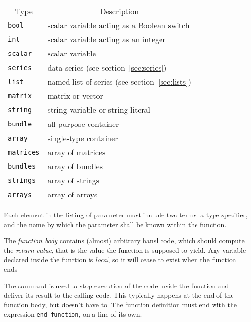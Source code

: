 \begin{center}
\begin{tabular}{ll}
  \multicolumn{1}{c}{Type} &
  \multicolumn{1}{c}{Description} \\ [4pt]
  \texttt{bool}   & scalar variable acting as a Boolean switch \\
  \texttt{int}    & scalar variable acting as an integer  \\
  \texttt{scalar} & scalar variable \\
  \texttt{series} & data series (see section~\ref{sec:series})\\
  \texttt{list}   & named list of series  (see section~\ref{sec:lists})\\
  \texttt{matrix} & matrix or vector \\
  \texttt{string} & string variable or string literal \\
  \texttt{bundle} & all-purpose container \\
  \texttt{array}  & single-type container \\
  \texttt{matrices} & array of matrices \\
  \texttt{bundles}  & array of bundles \\
  \texttt{strings}  & array of strings \\
  \texttt{arrays}   & array of arrays \\
\end{tabular}
\end{center}

Each element in the listing of parameter must include two terms: a
type specifier, and the name by which the parameter shall be known
within the function.

The \emph{function body} contains (almost) arbitrary hansl code, which
should compute the \emph{return value}, that is the value the function
is supposed to yield. Any variable declared inside the function is
\emph{local}, so it will cease to exist when the function ends.

The  command is used to stop execution of the code inside
the function and deliver its result to the calling code. This
typically happens at the end of the function body, but doesn't have
to. The function definition must end with the expression
\verb|end function|, on a line of its own.


